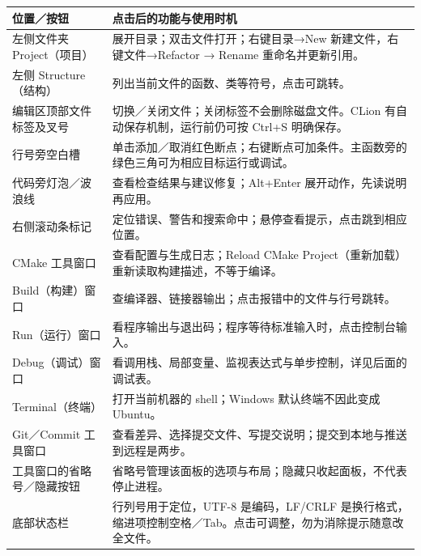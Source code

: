 \begingroup\small
\begin{longtable}{p{}p{}}
\toprule[1.5pt]
位置／按钮 & 点击后的功能与使用时机\\
\midrule[1pt]\endhead
左侧文件夹 Project（项目） & 展开目录；双击文件打开；右键目录→New 新建文件，右键文件→Refactor → Rename 重命名并更新引用。\\
左侧 Structure（结构） & 列出当前文件的函数、类等符号，点击可跳转。\\
编辑区顶部文件标签及叉号 & 切换／关闭文件；关闭标签不会删除磁盘文件。CLion 有自动保存机制，运行前仍可按 Ctrl+S 明确保存。\\
行号旁空白槽 & 单击添加／取消红色断点；右键断点可加条件。主函数旁的绿色三角可为相应目标运行或调试。\\
代码旁灯泡／波浪线 & 查看检查结果与建议修复；Alt+Enter 展开动作，先读说明再应用。\\
右侧滚动条标记 & 定位错误、警告和搜索命中；悬停查看提示，点击跳到相应位置。\\
CMake 工具窗口 & 查看配置与生成日志；Reload CMake Project（重新加载）重新读取构建描述，不等于编译。\\
Build（构建）窗口 & 查编译器、链接器输出；点击报错中的文件与行号跳转。\\
Run（运行）窗口 & 看程序输出与退出码；程序等待标准输入时，点击控制台输入。\\
Debug（调试）窗口 & 看调用栈、局部变量、监视表达式与单步控制，详见后面的调试表。\\
Terminal（终端） & 打开当前机器的 shell；Windows 默认终端不因此变成 Ubuntu。\\
Git／Commit 工具窗口 & 查看差异、选择提交文件、写提交说明；提交到本地与推送到远程是两步。\\
工具窗口的省略号／隐藏按钮 & 省略号管理该面板的选项与布局；隐藏只收起面板，不代表停止进程。\\
底部状态栏 & 行列号用于定位，UTF-8 是编码，LF/CRLF 是换行格式，缩进项控制空格／Tab。点击可调整，勿为消除提示随意改全文件。\\
\bottomrule[1.5pt]
\end{longtable}\endgroup

